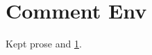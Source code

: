 \documentclass{article}
\begin{document}
\section{Comment Env}\label{sec:env_comment}

Kept prose \cite{k1} and \ref{sec:env_comment}.


\end{document}
